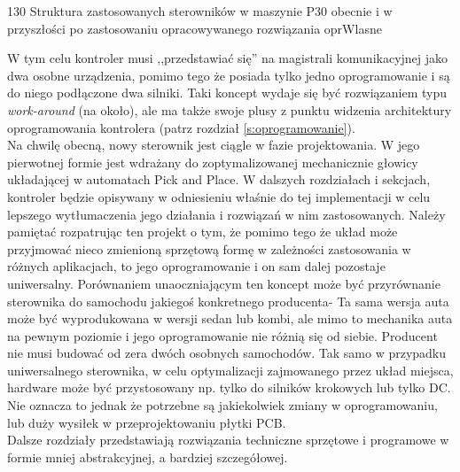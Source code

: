 	{130}
	{Struktura zastosowanych sterowników w maszynie P30 obecnie i w przyszłości po zastosowaniu opracowywanego rozwiązania}
	{oprWlasne}

W tym celu kontroler musi ,,przedstawiać się'' na magistrali komunikacyjnej jako dwa osobne urządzenia, pomimo tego że posiada tylko jedno oprogramowanie i są do niego podłączone dwa silniki. Taki koncept wydaje się być rozwiązaniem typu {\it work-around} (na około), ale ma także swoje plusy z punktu widzenia architektury oprogramowania kontrolera (patrz rozdział \ref{s:oprogramowanie}). \\

Na chwilę obecną, nowy sterownik jest ciągle w fazie projektowania. W jego pierwotnej formie jest wdrażany do zoptymalizowanej mechanicznie głowicy układającej w automatach Pick and Place. W dalszych rozdziałach i sekcjach, kontroler będzie opisywany w odniesieniu właśnie do tej implementacji w celu lepszego wytłumaczenia jego działania i rozwiązań w nim zastosowanych. Należy pamiętać rozpatrując ten projekt o tym, że pomimo tego że układ może przyjmować nieco zmienioną sprzętową formę w zależności zastosowania w różnych aplikacjach, to jego oprogramowanie i on sam dalej pozostaje uniwersalny. Porównaniem unaoczniającym ten koncept może być przyrównanie sterownika do samochodu jakiegoś konkretnego producenta- Ta sama wersja auta może być wyprodukowana w wersji sedan lub kombi, ale mimo to mechanika auta na pewnym poziomie i jego oprogramowanie nie różnią się od siebie. Producent nie musi budować od zera dwóch osobnych samochodów. Tak samo w przypadku uniwersalnego sterownika, w celu optymalizacji zajmowanego przez układ miejsca, hardware może być przystosowany np. tylko do silników krokowych lub tylko DC. Nie oznacza to jednak że potrzebne są jakiekolwiek zmiany w oprogramowaniu, lub duży wysiłek w przeprojektowaniu płytki PCB. \\

Dalsze rozdziały przedstawiają rozwiązania techniczne sprzętowe i programowe w formie mniej abstrakcyjnej, a bardziej szczegółowej.




\clearpage